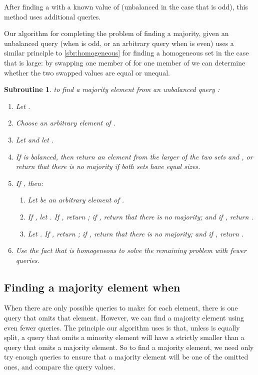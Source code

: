 \documentclass[11pt]{llncs}
\newtheorem{subroutine}{Subroutine}
\begin{document}
After finding a  with a known value of  (unbalanced in the case that  is odd),
this method uses  additional queries.

\ifFull
\else


Our algorithm for completing the problem of finding a majority, given an unbalanced query  (when  is odd, or an arbitrary query  when  is even) uses a similar principle to \autoref{sbr:homogeneous} for finding a homogeneous set in the case that  is large: by swapping one member of  for one member of  we can determine whether the two swapped values are equal or unequal.

\begin{subroutine} to find a majority element from an unbalanced query :
\begin{enumerate}
\item Let .
\item Choose an arbitrary element  of .
\item Let  and let .
\item If  is balanced, then return an element from the larger of the two sets  and , or return that there is no majority if both sets have equal sizes.
\item If , then:
\begin{enumerate}
\item Let  be an arbitrary element of .
\item If , let . If , return ; if , return that there is no majority; and if , return .
\item Let . If , return ; if , return that there is no majority; and if , return .
\end{enumerate}
\item Use the fact that  is homogeneous to solve the remaining problem with fewer queries.
\end{enumerate}
\end{subroutine}

\fi

\subsection{Finding a majority element when }

When  there are only  possible queries to make: for each element, there is one query that omits that element. However, we can find a majority element using even fewer queries. The principle our algorithm uses is that, unless  is equally split, a query that omits a minority element will have a strictly smaller  than a query that omits a majority element. So to find a majority element, we need only try enough queries to ensure that a majority element will be one of the omitted ones, and compare the query values.
\end{document}
